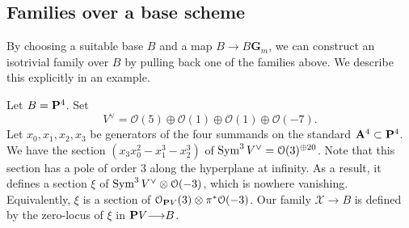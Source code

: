 \documentclass[12pt,reqno]{amsart}
\renewcommand{\to}{{\longrightarrow}}
\numberwithin{equation}{section}
\newcommand{\G}{\mathbf G}
\begin{document}
\subsection{Families over a base scheme}\label{sec:schematicexample}
By choosing a suitable base $B$ and a map $B \to B \G_m$, we
can construct an isotrivial family over $B$ by pulling back one of the
families above.  We describe this explicitly in an example.

Let $B = \P^4$.  Set
\[V^\vee = \mathcal O(5) \oplus \mathcal O(1) \oplus \mathcal O(1) \oplus
  \mathcal O(-7).\] Let $x_0, x_1, x_2, x_3$ be generators of the four
summands on the standard $\A^4 \subset \P^4$.  We have
the section $(x_3x_0^2-x_1^3-x_2^3)$ of
$\Sym^3 V^\vee = \mathcal O(3)^{\oplus 20}$.  Note that this section has a
pole of order $3$ along the hyperplane at infinity.  As a result, it
defines a section $\xi$ of $\Sym^3 V^\vee \otimes \mathcal O(-3)$, which is
nowhere vanishing.  Equivalently, $\xi$ is a section of
$\mathcal O_{\P V}(3) \otimes \pi^* \mathcal O(-3)$.  Our family
$\mathcal X \to B$ is defined by the zero-locus of $\xi$ in
$\P V \to B$.
\end{document}
